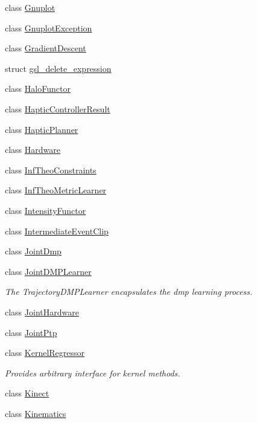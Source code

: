 \begin{DoxyCompactItemize}
class \hyperlink{classkukadu_1_1Gnuplot}{Gnuplot}
\item 
class \hyperlink{classkukadu_1_1GnuplotException}{Gnuplot\+Exception}
\item 
class \hyperlink{classkukadu_1_1GradientDescent}{Gradient\+Descent}
\item 
struct \hyperlink{structkukadu_1_1gsl__delete__expression}{gsl\+\_\+delete\+\_\+expression}
\item 
class \hyperlink{classkukadu_1_1HaloFunctor}{Halo\+Functor}
\item 
class \hyperlink{classkukadu_1_1HapticControllerResult}{Haptic\+Controller\+Result}
\item 
class \hyperlink{classkukadu_1_1HapticPlanner}{Haptic\+Planner}
\item 
class \hyperlink{classkukadu_1_1Hardware}{Hardware}
\item 
class \hyperlink{classkukadu_1_1InfTheoConstraints}{Inf\+Theo\+Constraints}
\item 
class \hyperlink{classkukadu_1_1InfTheoMetricLearner}{Inf\+Theo\+Metric\+Learner}
\item 
class \hyperlink{classkukadu_1_1IntensityFunctor}{Intensity\+Functor}
\item 
class \hyperlink{classkukadu_1_1IntermediateEventClip}{Intermediate\+Event\+Clip}
\item 
class \hyperlink{classkukadu_1_1JointDmp}{Joint\+Dmp}
\item 
class \hyperlink{classkukadu_1_1JointDMPLearner}{Joint\+D\+M\+P\+Learner}
\begin{DoxyCompactList}\small\item\em The Trajectory\+D\+M\+P\+Learner encapsulates the dmp learning process. \end{DoxyCompactList}\item 
class \hyperlink{classkukadu_1_1JointHardware}{Joint\+Hardware}
\item 
class \hyperlink{classkukadu_1_1JointPtp}{Joint\+Ptp}
\item 
class \hyperlink{classkukadu_1_1KernelRegressor}{Kernel\+Regressor}
\begin{DoxyCompactList}\small\item\em Provides arbitrary interface for kernel methods. \end{DoxyCompactList}\item 
class \hyperlink{classkukadu_1_1Kinect}{Kinect}
\item 
class \hyperlink{classkukadu_1_1Kinematics}{Kinematics}
\item 

\end{DoxyCompactItemize}
